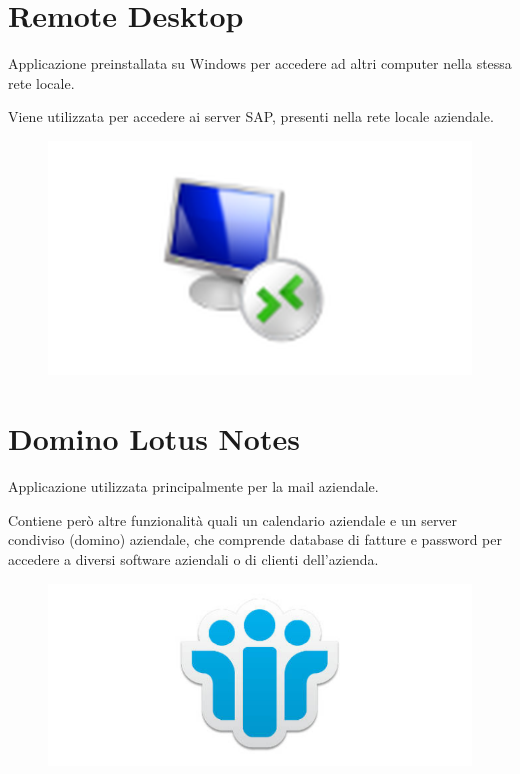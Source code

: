 \newpage

\section{Remote Desktop}
\begin{flushleft}
	Applicazione preinstallata su Windows per accedere ad altri computer nella stessa rete locale.
	
	Viene utilizzata per accedere ai server SAP, presenti nella rete locale aziendale.
\end{flushleft}
\begin{figure}[!h] 
	\centering
	\includegraphics[scale = 0.5]{immagini/tecnologie/remote-desktop}
\end{figure}

\section{Domino Lotus Notes}
\begin{flushleft}
	Applicazione utilizzata principalmente per la mail aziendale.
	
	Contiene però altre funzionalità quali un calendario aziendale e un server condiviso (domino) aziendale, che comprende database di fatture e password per accedere a diversi software aziendali o di clienti dell'azienda.
\end{flushleft}

\begin{figure}[!h] 
	\centering
	\includegraphics[scale = 0.5]{immagini/tecnologie/domino-lotus-notes.png}
\end{figure}

